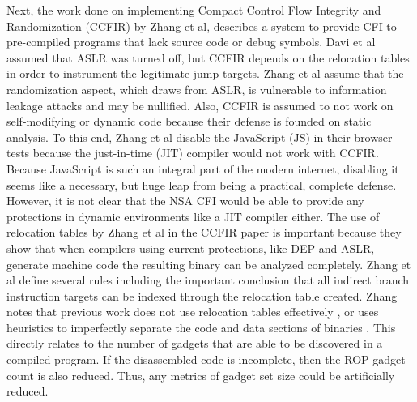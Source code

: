 \documentclass[letterpaper,10pt]{article}
\begin{document}
\indent Next, the work done on implementing Compact Control Flow Integrity and Randomization (CCFIR)\cite{Zhang:2013:CCFIR} by Zhang et al, describes a system to provide CFI to pre-compiled programs that lack source code or debug symbols. Davi et al assumed that ASLR was turned off\cite{Davi:2014}, but CCFIR depends on the relocation tables in order to instrument the legitimate jump targets. Zhang et al assume that the randomization aspect, which draws from ASLR, is vulnerable to information leakage attacks and may be nullified. Also, CCFIR is assumed to not work on self-modifying or dynamic code because their defense is founded on static analysis. To this end, Zhang et al disable the JavaScript (JS) in their browser tests because the just-in-time (JIT) compiler would not work with CCFIR. Because JavaScript is such an integral part of the modern internet, disabling it seems like a necessary, but huge leap from being a practical, complete defense. However, it is not clear that the NSA CFI would be able to provide any protections in dynamic environments like a JIT compiler either.
\newline
\indent The use of relocation tables by Zhang et al in the CCFIR paper is important because they show that when compilers using current protections, like DEP and ASLR, generate machine code the resulting binary can be analyzed completely\cite{Zhang:2013:CCFIR}. Zhang et al define several rules including the important conclusion that all indirect branch instruction targets can be indexed through the relocation table created. Zhang notes that previous work does not use relocation tables effectively \cite{Schwarz:2002}, or uses heuristics to imperfectly separate the code and data sections of binaries \cite{Prasad:2003, IDA, Hiser:2012}. This directly relates to the number of gadgets that are able to be discovered in a compiled program. If the disassembled code is incomplete, then the ROP gadget count is also reduced. Thus, any metrics of gadget set size could be artificially reduced.
\newline
\end{document}
